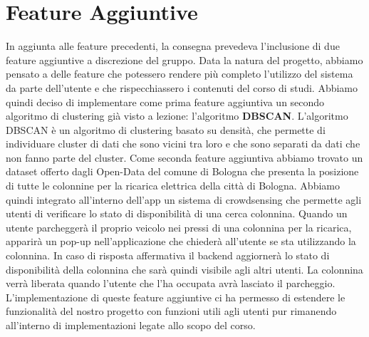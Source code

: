 \documentclass[../../Report.tex]{subfiles}
\begin{document}
    \section{Feature Aggiuntive}
    In aggiunta alle feature precedenti, la consegna prevedeva l'inclusione di due feature aggiuntive a discrezione del gruppo. Data la natura del progetto, abbiamo pensato a delle feature che potessero rendere più completo l'utilizzo del sistema da parte dell'utente e che rispecchiassero i contenuti del corso di studi. Abbiamo quindi deciso di implementare come prima feature aggiuntiva un secondo algoritmo di clustering già visto a lezione: l'algoritmo \textbf{DBSCAN}. L'algoritmo DBSCAN è un algoritmo di clustering basato su densità, che permette di individuare cluster di dati che sono vicini tra loro e che sono separati da dati che non fanno parte del cluster. Come seconda feature aggiuntiva abbiamo trovato un dataset offerto dagli Open-Data del comune di Bologna che presenta la posizione di tutte le colonnine per la ricarica elettrica della città di Bologna. Abbiamo quindi integrato all'interno dell'app un sistema di crowdsensing che permette agli utenti di verificare lo stato di disponibilità di una cerca colonnina. Quando un utente parcheggerà il proprio veicolo nei pressi di una colonnina per la ricarica, apparirà un pop-up nell'applicazione che chiederà all'utente se sta utilizzando la colonnina. In caso di risposta affermativa il backend aggiornerà lo stato di disponibilità della colonnina che sarà quindi visibile agli altri utenti. La colonnina verrà liberata quando l'utente che l'ha occupata avrà lasciato il parcheggio. L'implementazione di queste feature aggiuntive ci ha permesso di estendere le funzionalità del nostro progetto con funzioni utili agli utenti pur rimanendo all'interno di implementazioni legate allo scopo del corso. \\
    
\end{document}

